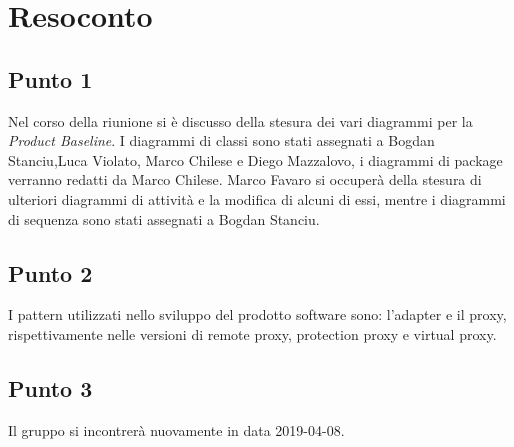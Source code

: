 \section{Resoconto}

\subsection{Punto 1}
Nel corso della riunione si è discusso della stesura dei vari diagrammi per la \textit{Product Baseline}. I diagrammi di classi sono stati assegnati a Bogdan Stanciu,Luca Violato, Marco Chilese e Diego Mazzalovo, i diagrammi di package verranno redatti da Marco Chilese.
Marco Favaro si occuperà della stesura di ulteriori diagrammi di attività e la modifica di alcuni di essi, mentre i diagrammi di sequenza sono stati assegnati a Bogdan Stanciu.

\subsection{Punto 2}
I pattern utilizzati nello sviluppo del prodotto software sono: l'adapter e il proxy, rispettivamente nelle versioni di remote proxy, protection proxy e virtual proxy.
	
\subsection{Punto 3}
Il gruppo si incontrerà nuovamente in data 2019-04-08.